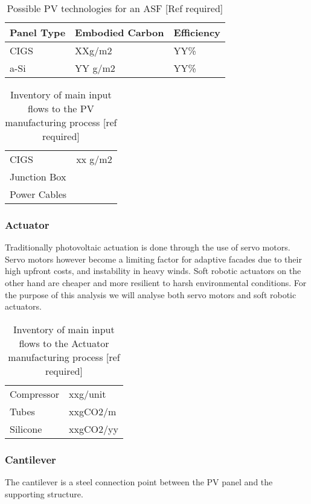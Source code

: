 \begin{table}[H]
\centering
\begin{tabular}{lll}
Panel Type		   & Embodied Carbon        & Efficiency     \\
\hline
CIGS 				 & XXg/m2 & YY\% \\
a-Si				 & YY g/m2        & YY\%    \\
\end{tabular}
\caption{Possible PV technologies for an ASF [Ref required]}
\label{tab:PV}
\end{table}

\begin{table}[H]
\centering
\begin{tabular}{ll}
\hline
CIGS         & xx g/m2 \\
Junction Box &         \\
Power Cables &         \\
\hline
\end{tabular}
\caption{Inventory of main input flows to the PV manufacturing process [ref required]}
\label{tab:PVinv}
\end{table}


\subsubsection*{Actuator}
Traditionally photovoltaic actuation is done through the use of servo motors. Servo motors however become a limiting factor for adaptive facades due to their high upfront costs, and instability in heavy winds. Soft robotic actuators on the other hand are cheaper and more resilient to harsh environmental conditions\cite{Svetozarevic2014a}. For the purpose of this analysis we will analyse both servo motors and soft robotic actuators. \\

\begin{table}[H]
\centering
\begin{tabular}{ll}
\hline
Compressor & xxg/unit  \\
Tubes      & xxgCO2/m  \\
Silicone   & xxgCO2/yy \\
\hline
\end{tabular}
\caption{Inventory of main input flows to the Actuator manufacturing process [ref required]}
\label{tab:ActuatorInv}
\end{table}

\subsubsection*{Cantilever}
The cantilever is a steel connection point between the PV panel and the supporting structure.\\

